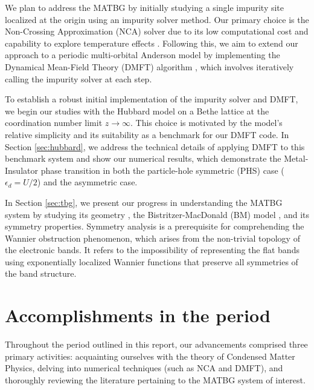 \documentclass[12pt]{report}
\begin{document}
We plan to address the MATBG by initially studying a single impurity site localized at the origin using an impurity solver method. Our primary choice is the Non-Crossing Approximation (NCA) solver due to its low computational cost and capability to explore temperature effects \cite{impurity-solvers}. Following this, we aim to extend our approach to a periodic multi-orbital Anderson model by implementing the Dynamical Mean-Field Theory (DMFT) algorithm \cite{georges1996}, which involves iteratively calling the impurity solver at each step.

To establish a robust initial implementation of the impurity solver and DMFT, we begin our studies with the Hubbard model \cite{hubbard1963} on a Bethe lattice at the coordination number limit $z\to\infty$. This choice is motivated by the model's relative simplicity and its suitability as a benchmark for our DMFT code. In Section \ref{sec:hubbard}, we address the technical details of applying DMFT to this benchmark system and show our numerical results, which demonstrate the Metal-Insulator phase transition in both the particle-hole symmetric (PHS) case ($\epsilon_d = U/2$) and the asymmetric case.

In Section \ref{sec:tbg}, we present our progress in understanding the MATBG system by studying its geometry \cite{handbook2019}, the Bistritzer-MacDonald (BM) model \cite{macdonald2011}, and its symmetry properties. Symmetry analysis is a prerequisite for comprehending the Wannier obstruction phenomenon, which arises from the non-trivial topology of the electronic bands. It refers to the impossibility of representing the flat bands using exponentially localized Wannier functions that preserve all symmetries of the band structure.

\pagebreak


\chapter{Accomplishments in the period} \label{chp:accomplishments}

Throughout the period outlined in this report, our advancements comprised three primary activities: acquainting ourselves with the theory of Condensed Matter Physics, delving into numerical techniques (such as NCA and DMFT), and thoroughly reviewing the literature pertaining to the MATBG system of interest.
\end{document}
